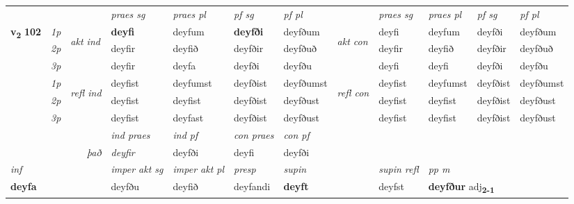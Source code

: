 \begin{longtable}[l]{X>{\footnotesize\itshape}llXXXXlXXXX}
 & &   & \textit{praes sg}  & \textit{praes pl}    & \textit{ pf sg} & \textit{pf pl} & & \textit{praes sg}  & \textit{praes pl}    & \textit{pf sg} & \textit{pf pl }  \\ \cmidrule{4-7} \cmidrule{9-12}
 \multirow{2}{*}{{{\textbf{v{\textsubscript{2}}} \Large{\textbf{102}}}}}  & 1p & \multirow{3}{*}{\begin{turn}{90}\textit{akt ind}\end{turn}} & \textbf{deyfi} & deyfum & \textbf{deyfði} & deyfðum & \multirow{3}{*}{\begin{turn}{90}\textit{akt con}\end{turn}} &deyfi & deyfum & deyfði & deyfðum\\*
 & 2p &  &  deyfir  & deyfið & deyfðir & deyfðuð & & deyfir & deyfið & deyfðir & deyfðuð \\*
 & 3p &  & deyfir & deyfa & deyfði & deyfðu & & deyfi & deyfi& deyfði & deyfðu \\*
\cmidrule{4-7} \cmidrule{9-12}
 & 1p & \multirow{3}{*}{\begin{turn}{90}\textit{refl ind}\end{turn}}  & deyfist & deyfumst & deyfðist & deyfðumst & \multirow{3}{*}{\begin{turn}{90}\textit{refl con}\end{turn}}  &deyfist & deyfumst & deyfðist & deyfðumst \\*
 & 2p &  & deyfist & deyfist & deyfðist & deyfðust & &deyfist & deyfist & deyfðist & deyfðust \\*
 & 3p  & & deyfist & deyfast & deyfðist & deyfðust & & deyfist & deyfist& deyfðist & deyfðust \\*
\cmidrule{4-7} \cmidrule{9-12}

   && &  \textit{ind praes} & \textit{ind pf} & \textit{con praes} & \textit{con pf} \\*
\multicolumn{3}{r}{\textit{það}} & deyfir & deyfði & deyfi & deyfði \\*

\cmidrule{4-7}
   {\textit{inf}} & &  & \textit{imper akt sg} & \textit{imper akt pl}   & \textit{presp} & \textit{supin} && \textit{supin refl} & \textit{pp m} \\*
  {\textbf{deyfa}} & && deyfðu  & deyfið   & deyfandi &  \textbf{deyft} && deyfst & \multicolumn{2}{l}{\textbf{deyfður} adj\textbf{\textsubscript{2-1}}} \\*

\midrule


\end{longtable}
